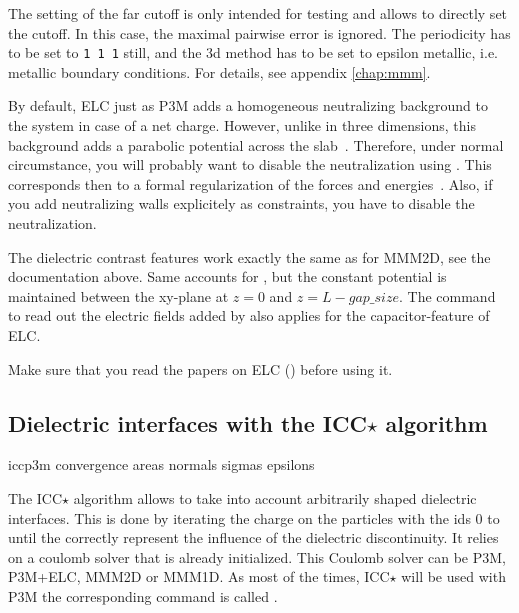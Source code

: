 The setting of the far cutoff  is only intended for
testing and allows to directly set the cutoff. In this case, the
maximal pairwise error is ignored. The periodicity has to be set to
\texttt{1 1 1} still, and the 3d method has to be set to epsilon
metallic, i.e.  metallic boundary conditions. For details, see
appendix \vref{chap:mmm}.

By default, ELC just as P3M adds a homogeneous neutralizing background
to the system in case of a net charge. However, unlike in three
dimensions, this background adds a parabolic potential across the
slab~\cite{ballenegger09a}. Therefore, under normal circumstance, you
will probably want to disable the neutralization using
. This corresponds then to a formal
regularization of the forces and energies~\cite{ballenegger09a}. Also,
if you add neutralizing walls explicitely as constraints, you have to
disable the neutralization.

The dielectric contrast features work exactly the same as for MMM2D,
see the documentation above. Same accounts for  
, but the constant potential is maintained between the xy-plane
at $z=0$ and $z=L-gap\_size$. The command  to read  
out the electric fields added by   also applies 
for the capacitor-feature of ELC.

Make sure that you read the papers on ELC (\cite{elc,icelc})
before using it.

\subsection{Dielectric interfaces with the ICC$\star$ algorithm}

\begin{essyntax}
  iccp3m  
  convergence 
  areas 
  normals 
  sigmas 
  epsilons 
  \begin{features}
  \end{features}
\end{essyntax}

The ICC$\star$ algorithm allows to take into account arbitrarily
shaped dielectric interfaces.  This is done by iterating the charge on
the particles with the ids 0 to  until
the correctly represent the influence of the dielectric
discontinuity. It relies on a coulomb solver that is already
initialized. This Coulomb solver can be P3M, P3M+ELC, MMM2D or MMM1D.
As most of the times, ICC$\star$ will be used with P3M the
corresponding command is called .

